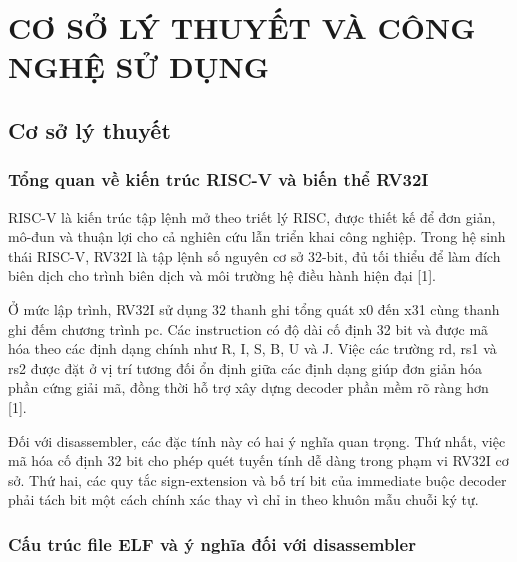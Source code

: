 \documentclass[
]{article}
\begin{document}
\hypertarget{cux1a1-sux1edf-luxfd-thuyux1ebft-vuxe0-cuxf4ng-nghux1ec7-sux1eed-dux1ee5ng}{%
\section{CƠ SỞ LÝ THUYẾT VÀ CÔNG NGHỆ SỬ
DỤNG}\label{cux1a1-sux1edf-luxfd-thuyux1ebft-vuxe0-cuxf4ng-nghux1ec7-sux1eed-dux1ee5ng}}

\hypertarget{cux1a1-sux1edf-luxfd-thuyux1ebft}{%
\subsection{\texorpdfstring{ Cơ sở lý
thuyết}{ Cơ sở lý thuyết}}\label{cux1a1-sux1edf-luxfd-thuyux1ebft}}

\hypertarget{tux1ed5ng-quan-vux1ec1-kiux1ebfn-truxfac-risc-v-vuxe0-biux1ebfn-thux1ec3-rv32i}{%
\subsubsection{\texorpdfstring{ Tổng quan về kiến trúc RISC-V và biến
thể
RV32I}{ Tổng quan về kiến trúc RISC-V và biến thể RV32I}}\label{tux1ed5ng-quan-vux1ec1-kiux1ebfn-truxfac-risc-v-vuxe0-biux1ebfn-thux1ec3-rv32i}}

RISC-V là kiến trúc tập lệnh mở theo triết lý RISC, được thiết kế để đơn
giản, mô-đun và thuận lợi cho cả nghiên cứu lẫn triển khai công nghiệp.
Trong hệ sinh thái RISC-V, RV32I là tập lệnh số nguyên cơ sở 32-bit, đủ
tối thiểu để làm đích biên dịch cho trình biên dịch và môi trường hệ
điều hành hiện đại {[}1{]}.

Ở mức lập trình, RV32I sử dụng 32 thanh ghi tổng quát x0 đến x31 cùng
thanh ghi đếm chương trình pc. Các instruction có độ dài cố định 32 bit
và được mã hóa theo các định dạng chính như R, I, S, B, U và J. Việc các
trường rd, rs1 và rs2 được đặt ở vị trí tương đối ổn định giữa các định
dạng giúp đơn giản hóa phần cứng giải mã, đồng thời hỗ trợ xây dựng
decoder phần mềm rõ ràng hơn {[}1{]}.

Đối với disassembler, các đặc tính này có hai ý nghĩa quan trọng. Thứ
nhất, việc mã hóa cố định 32 bit cho phép quét tuyến tính dễ dàng trong
phạm vi RV32I cơ sở. Thứ hai, các quy tắc sign-extension và bố trí bit
của immediate buộc decoder phải tách bit một cách chính xác thay vì chỉ
in theo khuôn mẫu chuỗi ký tự.

\hypertarget{cux1ea5u-truxfac-file-elf-vuxe0-uxfd-nghux129a-ux111ux1ed1i-vux1edbi-disassembler}{%
\subsubsection{\texorpdfstring{ Cấu trúc file ELF và ý nghĩa đối với
disassembler}{ Cấu trúc file ELF và ý nghĩa đối với disassembler}}\label{cux1ea5u-truxfac-file-elf-vuxe0-uxfd-nghux129a-ux111ux1ed1i-vux1edbi-disassembler}}
\end{document}
